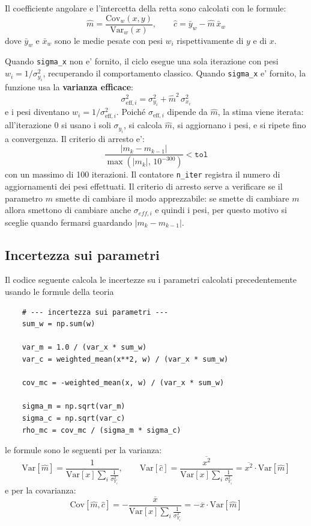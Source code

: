 Il coefficiente angolare e l'intercetta della retta sono calcolati con le formule:
\[
\hat{m} = \frac{\mathrm{Cov}_w(x,y)}{\mathrm{Var}_w(x)}, \qquad \hat{c} = \bar{y}_w - \hat{m}\,\bar{x}_w
\]
dove \(\bar{y}_w\) e \(\bar{x}_w\) sono le medie pesate con pesi \(w_i\) rispettivamente di \(y\) e di \(x\).

Quando \texttt{sigma\_x} non e' fornito, il ciclo esegue una sola iterazione con pesi \(w_i = 1/\sigma_{y_i}^2\), recuperando il comportamento classico. Quando \texttt{sigma\_x} e' fornito, la funzione usa la \textbf{varianza efficace}:
\[
\sigma_{\mathrm{eff},i}^2 = \sigma_{y_i}^2 + \hat{m}^2\,\sigma_{x_i}^2
\]
e i pesi diventano \(w_i = 1/\sigma_{\mathrm{eff},i}^2\). Poiché \(\sigma_{\mathrm{eff},i}\) dipende da \(\hat{m}\), la stima viene iterata: all'iterazione 0 si usano i soli \(\sigma_{y_i}\), si calcola \(\hat{m}\), si aggiornano i pesi, e si ripete fino a convergenza. Il criterio di arresto e':
\[
\frac{|m_k - m_{k-1}|}{\max(|m_k|,\,10^{-300})} < \texttt{tol}
\]
con un massimo di 100 iterazioni. Il contatore \texttt{n\_iter} registra il numero di aggiornamenti dei pesi effettuati. Il criterio di arresto serve a verificare se il parametro \(m\) smette di cambiare il modo apprezzabile: se smette di cambiare \(m\) allora smettono di cambiare anche \(\sigma_{eff,i}\) e quindi i pesi, per questo motivo si sceglie quando fermarsi guardando \(|m_k - m_{k-1}|\).

\subsection{Incertezza sui parametri}

Il codice seguente calcola le incertezze su i parametri calcolati precedentemente usando le formule della teoria

\begin{verbatim}
    # --- incertezza sui parametri ---
    sum_w = np.sum(w)

    var_m = 1.0 / (var_x * sum_w)
    var_c = weighted_mean(x**2, w) / (var_x * sum_w)

    cov_mc = -weighted_mean(x, w) / (var_x * sum_w)

    sigma_m = np.sqrt(var_m)
    sigma_c = np.sqrt(var_c)
    rho_mc = cov_mc / (sigma_m * sigma_c)
\end{verbatim}

le formule sono le seguenti per la varianza:
\[
\text{Var}[\hat{m}] = \frac{1}{\text{Var}[x] \sum_i \frac{1}{\sigma^2_{Y_i}}}, \qquad \text{Var}[\hat{c}] = \frac{\overline{x^2}}{\text{Var}[x] \sum_i \frac{1}{\sigma^2_{Y_i}}} = \overline{x^2} \cdot \text{Var}[\hat{m}]
\]
e per la covarianza:
\[
\text{Cov}[\hat{m}, \hat{c}] =- \frac{\overline{x}}{\text{Var}[x]\sum_i \frac{1}{\sigma^2_{Y_i}}} = - \overline{x} \cdot \text{Var}[\hat{m}]
\]

